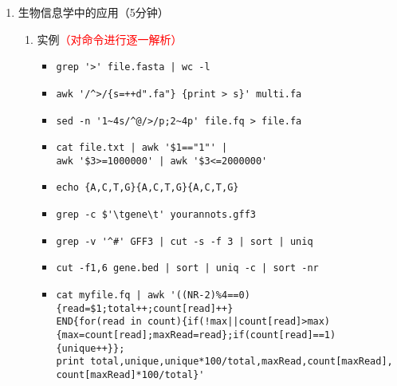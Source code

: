 \documentclass{TIJMUjiaoanLL}
\begin{document}
\begin{enumerate}
\begin{enumerate}
\begin{enumerate}
	  \item 实例
	    \begin{itemize}
	      \item \verb|awk '{print $0}' 123.txt|
	      \item \verb=ls -l | awk '{if($1 !~ /^d/) {print $0}}'=
	      \item \verb|awk '{printf("%03d %s\n",NR,$0)}' ori.txt > dst.txt|
	      \item \verb|awk 'BEGIN{FS=" ";OFS="\t"}{print $1,$2} ori.txt > dst.txt|
	    \end{itemize}
	  \vspace*{-10pt}
	    \begin{figure}[h]
	      \centering
	      \texttt{[image: c5.awk.01.jpg]}
	      \quad
	      \texttt{[image: c5.awk.02.jpg]}
	  \end{figure}
          \vspace*{-10pt}
	\end{enumerate}
    \end{enumerate}
  \item 生物信息学中的应用（5分钟）
    \begin{enumerate}
      \item  实例\textcolor{red}{（对命令进行逐一解析）}
	\begin{itemize}
          \item \verb=grep '>' file.fasta | wc -l=
	  \item \verb|awk '/^>/{s=++d".fa"} {print > s}' multi.fa|
          \item \verb|sed -n '1~4s/^@/>/p;2~4p' file.fq > file.fa|
          \item \verb~cat file.txt | awk '$1=="1"' |~ \\ \verb~awk '$3>=1000000' | awk '$3<=2000000'~
          \item \verb=echo {A,C,T,G}{A,C,T,G}{A,C,T,G}=
	  \item \verb|grep -c $'\tgene\t' yourannots.gff3|
          \item \verb~grep -v '^#' GFF3 | cut -s -f 3 | sort | uniq~
          \item \verb=cut -f1,6 gene.bed | sort | uniq -c | sort -nr=
          \item {\small \verb~cat myfile.fq | awk '((NR-2)%4==0){read=$1;total++;count[read]++}~ \\ \verb~END{for(read in count){if(!max||count[read]>max)~ \\ \verb~{max=count[read];maxRead=read};if(count[read]==1){unique++}};~ \\ \verb~print total,unique,unique*100/total,maxRead,count[maxRead],~ \\ \verb~count[maxRead]*100/total}'~}
	\end{itemize}
    \end{enumerate}


\end{enumerate}
\end{document}
